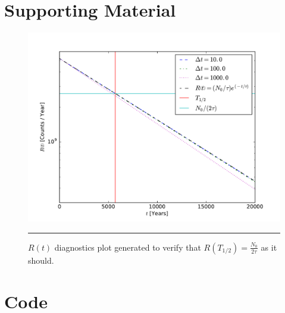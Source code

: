 \documentclass[notitlepage,aps,prd,nofootinbib]{revtex4-1}
\begin{document}
\clearpage
\section{Supporting Material}
\label{sec:Supporting_Material}

\begin{figure}[!htbc]
  \centering
  \includegraphics[width=.70\textwidth]{output/diagnostic_plot.pdf}
	{\par\nobreak\rule[9pt]{35em}{0.5pt}\vspace{-5mm}}
	\caption{$R\left(t\right)$ diagnostics plot generated to verify that $R\left(T_{1/2}\right) = \frac{N_{0}}{2\tau}$ as it should.}
	\label{fig:diagnostic_plot}
\end{figure}

\clearpage


\clearpage
\section{Code}

\end{document}
